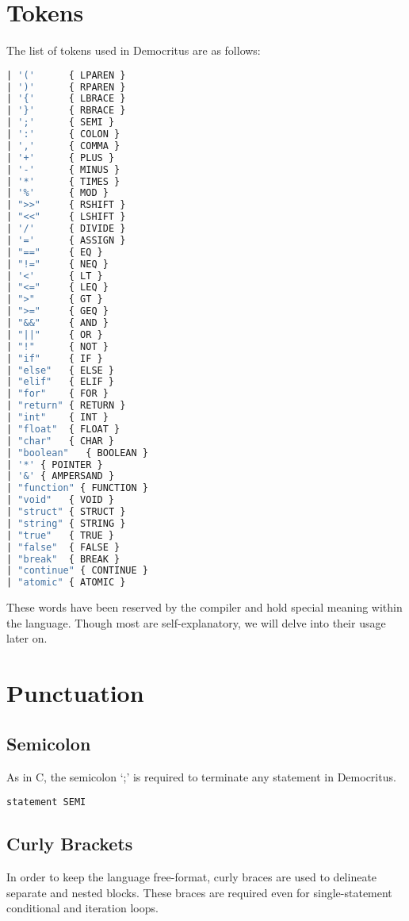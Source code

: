 	\section{Tokens}
		The list of tokens used in Democritus are as follows:
		\begin{lstlisting}[language=Caml]
| '('      { LPAREN }
| ')'      { RPAREN }
| '{'      { LBRACE }
| '}'      { RBRACE }
| ';'      { SEMI }
| ':'      { COLON }
| ','      { COMMA }
| '+'      { PLUS }
| '-'      { MINUS } 
| '*'      { TIMES }
| '%'      { MOD }
| ">>"     { RSHIFT }
| "<<"     { LSHIFT }
| '/'      { DIVIDE }
| '='      { ASSIGN }
| "=="     { EQ }
| "!="     { NEQ }
| '<'      { LT }
| "<="     { LEQ }
| ">"      { GT }
| ">="     { GEQ }
| "&&"     { AND }
| "||"     { OR }
| "!"      { NOT }
| "if"     { IF }
| "else"   { ELSE }
| "elif"   { ELIF }
| "for"    { FOR }
| "return" { RETURN }
| "int"    { INT }
| "float"  { FLOAT }
| "char"   { CHAR }
| "boolean"   { BOOLEAN }
| '*' { POINTER }
| '&' { AMPERSAND }
| "function" { FUNCTION }
| "void"   { VOID }
| "struct" { STRUCT }
| "string" { STRING }
| "true"   { TRUE }
| "false"  { FALSE }
| "break"  { BREAK } 
| "continue" { CONTINUE }
| "atomic" { ATOMIC }
		\end{lstlisting}
		
		\noindent These words have been reserved by the compiler and hold special meaning within the language. Though most are self-explanatory, we will delve into their usage later on. 
		
	\section{Punctuation}
		\subsection{Semicolon}
			As in C, the semicolon `;' is required to terminate any statement in Democritus. 
			
			\begin{lstlisting}
statement SEMI
			\end{lstlisting}
			
		\subsection{Curly Brackets}
			In order to keep the language free-format, curly braces are used to delineate separate and nested blocks. These braces are required even for single-statement conditional and iteration loops.
			

